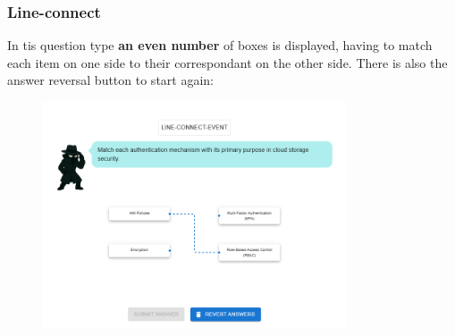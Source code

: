 \subsubsection{Line-connect}\label{qt:line}
In tis question type \textbf{an even number} of boxes is displayed, having to match each item on one side to their correspondant
on the other side. There is also the answer reversal button to start again:
\begin{figure}[htbp]
    \centering
    \includegraphics[width=0.8\textwidth]{images/Line_Connect.png}
\end{figure}